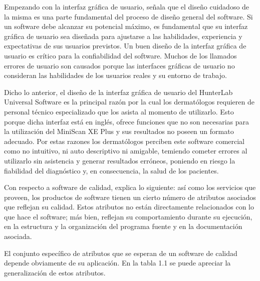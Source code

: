 	Empezando con la interfaz gr\'{a}fica de usuario,  se\~{n}ala que el dise\~{n}o cuidadoso de la misma es una parte fundamental del proceso de dise\~{n}o general del software. Si un software debe alcanzar su potencial m\'{a}ximo, es fundamental que su interfaz gr\'{a}fica de usuario sea dise\~{n}ada para ajustarse a las habilidades, experiencia y expectativas de sus usuarios previstos. Un buen dise\~{n}o de la interfaz gr\'{a}fica de usuario es cr\'{i}tico para la confiabilidad del software. Muchos de los llamados errores de usuario son causados porque las interfaces gr\'{a}ficas de usuario no consideran las habilidades de los usuarios reales y su entorno de trabajo.

	Dicho lo anterior, el dise\~{n}o de la interfaz gr\'{a}fica de usuario del HunterLab Universal Software es la principal raz\'{o}n por la cual los dermat\'{o}logos requieren de personal t\'{e}cnico especializado que los asista al momento de utilizarlo. Esto porque dicha interfaz est\'{a} en ingl\'{e}s, ofrece funciones que no son necesarias para la utilizaci\'{o}n del MiniScan XE Plus y sus resultados no poseen un formato adecuado. Por estas razones los dermat\'{o}logos perciben este software comercial como no intuitivo, ni auto descriptivo ni amigable, temiendo cometer errores al utilizarlo sin asistencia y generar resultados err\'{o}neos, poniendo en riesgo la fiabilidad del diagn\'{o}stico y, en consecuencia, la salud de los pacientes.

	Con respecto a software de calidad,  explica lo siguiente: as\'{i} como los servicios que proveen, los productos de software tienen un cierto n\'{u}mero de atributos asociados que reflejan su calidad. Estos atributos no est\'{a}n directamente relacionados con lo que hace el software; m\'{a}s bien, reflejan su comportamiento durante su ejecuci\'{o}n, en la estructura y la organizaci\'{o}n del programa fuente y en la documentaci\'{o}n asociada.

El conjunto espec\'{i}fico de atributos que se esperan de un software de calidad depende obviamente de su aplicaci\'{o}n. En la tabla 1.1 se puede apreciar la generalizaci\'{o}n de estos atributos.

